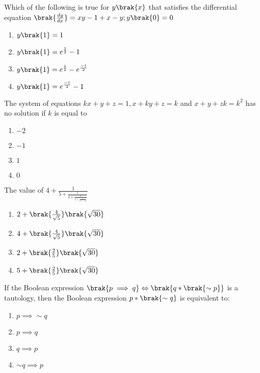 \iffalse
    \title{2021}
    \author{EE24BTECH11029}
    \section{mcq-single}
\fi 

\item Which of the following is true for $y\brak{x}$ that satisfies the differential equation $\brak{\frac{dy}{dx}}=xy-1+x-y;y\brak{0}=0$
    \begin{enumerate}
        \item $y\brak{1}=1$
        \item $y\brak{1}=e^{\frac{1}{2}}-1$
        \item $y\brak{1}=e^{\frac{1}{2}}-e^{\frac{-1}{2}}$
        \item $y\brak{1}=e^{\frac{-1}{2}}-1$\\
    \end{enumerate}
    \item The system of equations $kx+y+z=1, x+ky+z=k$ and $x+y+zk=k^2$ has no solution if $k$ is equal to
    \begin{enumerate}
        \item $-2$
        \item $-1$
        \item $1$
        \item $0$\\
    \end{enumerate}
    \item The value of $4+\frac{1}{5+\frac{1}{4+\frac{1}{5+\frac{1}{4+\dots\infty}}}}$
    \begin{enumerate}
        \item $2+\brak{\frac{4}{\sqrt{5}}}\brak{\sqrt{30}}$
        \item $4+\brak{\frac{4}{\sqrt{5}}}\brak{\sqrt{30}}$
        \item $2+\brak{\frac{2}{5}}\brak{\sqrt{30}}$
        \item $5+\brak{\frac{2}{5}}\brak{\sqrt{30}}$\\
    \end{enumerate}
    \item If the Boolean expression $\brak{p\implies q}\Leftrightarrow\brak{q*\brak{\sim p}}$  is a tautology, then the Boolean expression $p*\brak{\sim q}$ is equivalent to:
    \begin{enumerate}
        \item $p\implies\sim q$
        \item $p\implies q$
        \item $q\implies p$
        \item $\sim q\implies p$\\
    \end{enumerate}
